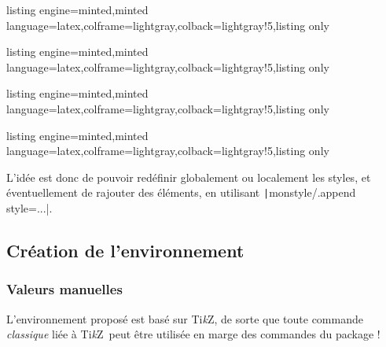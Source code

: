 \documentclass[11pt,a4paper]{ltxdoc}
\providecommand\tikzlogo{Ti\textit{k}Z}
\let\TikZ\tikzlogo
\begin{document}
\begin{tcblisting}{listing engine=minted,minted language=latex,colframe=lightgray,colback=lightgray!5,listing only}
\end{tcblisting}

\begin{tcblisting}{listing engine=minted,minted language=latex,colframe=lightgray,colback=lightgray!5,listing only}

\end{tcblisting}

\begin{tcblisting}{listing engine=minted,minted language=latex,colframe=lightgray,colback=lightgray!5,listing only}
\end{tcblisting}

\begin{tcblisting}{listing engine=minted,minted language=latex,colframe=lightgray,colback=lightgray!5,listing only}
\end{tcblisting}

L'idée est donc de pouvoir redéfinir globalement ou localement les styles, et éventuellement de rajouter des éléments, en utilisant \texttt|monstyle/.append style={...}|.

\subsection{Création de l'environnement}\label{creaenvt}

\subsubsection{Valeurs manuelles}

L'environnement proposé est basé sur \TikZ, de sorte que toute commande \textit{classique} liée à \TikZ\ peut être utilisée en marge des commandes du package !
\end{document}
